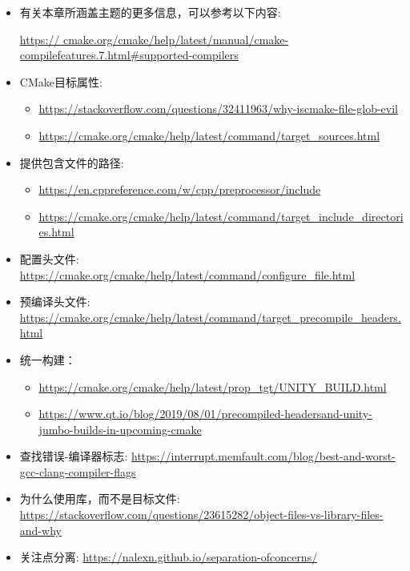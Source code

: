 \begin{itemize}
\item 
有关本章所涵盖主题的更多信息，可以参考以下内容:

\url{https:// cmake.org/cmake/help/latest/manual/cmake-compilefeatures.7.html\#supported-compilers}

\item 
CMake目标属性:

\begin{itemize}
\item 
\url{https://stackoverflow.com/questions/32411963/why-iscmake-file-glob-evil}

\item 
\url{https://cmake.org/cmake/help/latest/command/target_sources.html}
\end{itemize}

\item 
提供包含文件的路径:

\begin{itemize}
\item 
\url{https://en.cppreference.com/w/cpp/preprocessor/include}

\item 
\url{https://cmake.org/cmake/help/latest/command/target_include_directories.html}
\end{itemize}

\item 
配置头文件: \url{https://cmake.org/cmake/help/latest/command/configure_file.html}

\item 
预编译头文件: \url{https://cmake.org/cmake/help/latest/command/target_precompile_headers.html}

\item 
统一构建：

\begin{itemize}
\item 
\url{https://cmake.org/cmake/help/latest/prop_tgt/UNITY_BUILD.html}

\item 
\url{https://www.qt.io/blog/2019/08/01/precompiled-headersand-unity-jumbo-builds-in-upcoming-cmake}
\end{itemize}

\item 
查找错误-编译器标志: \url{https://interrupt.memfault.com/blog/best-and-worst-gcc-clang-compiler-flags}

\item 
为什么使用库，而不是目标文件: \url{https://stackoverflow.com/questions/23615282/object-files-vs-library-files-and-why}

\item 
关注点分离: \url{https://nalexn.github.io/separation-ofconcerns/}
\end{itemize}









